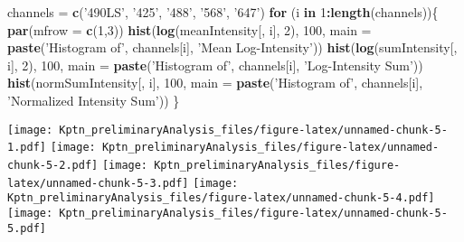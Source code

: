 \documentclass[]{article}
\newenvironment{Shaded}{\begin{snugshade}}{\end{snugshade}}
\newcommand{\ControlFlowTok}[1]{\textcolor[rgb]{0.13,0.29,0.53}{\textbf{#1}}}
\newcommand{\DataTypeTok}[1]{\textcolor[rgb]{0.13,0.29,0.53}{#1}}
\newcommand{\DecValTok}[1]{\textcolor[rgb]{0.00,0.00,0.81}{#1}}
\newcommand{\KeywordTok}[1]{\textcolor[rgb]{0.13,0.29,0.53}{\textbf{#1}}}
\newcommand{\NormalTok}[1]{#1}
\newcommand{\OperatorTok}[1]{\textcolor[rgb]{0.81,0.36,0.00}{\textbf{#1}}}
\newcommand{\StringTok}[1]{\textcolor[rgb]{0.31,0.60,0.02}{#1}}
\begin{document}
\begin{Shaded}
\begin{Highlighting}[]
\NormalTok{channels =}\StringTok{ }\KeywordTok{c}\NormalTok{(}\StringTok{'490LS'}\NormalTok{, }\StringTok{'425'}\NormalTok{, }\StringTok{'488'}\NormalTok{, }\StringTok{'568'}\NormalTok{, }\StringTok{'647'}\NormalTok{)}
\ControlFlowTok{for}\NormalTok{ (i }\ControlFlowTok{in} \DecValTok{1}\OperatorTok{:}\KeywordTok{length}\NormalTok{(channels))\{}
\KeywordTok{par}\NormalTok{(}\DataTypeTok{mfrow =} \KeywordTok{c}\NormalTok{(}\DecValTok{1}\NormalTok{,}\DecValTok{3}\NormalTok{))}
\KeywordTok{hist}\NormalTok{(}\KeywordTok{log}\NormalTok{(meanIntensity[, i], }\DecValTok{2}\NormalTok{), }\DecValTok{100}\NormalTok{, }\DataTypeTok{main =} \KeywordTok{paste}\NormalTok{(}\StringTok{'Histogram of'}\NormalTok{, channels[i], }\StringTok{'Mean Log-Intensity'}\NormalTok{))}
\KeywordTok{hist}\NormalTok{(}\KeywordTok{log}\NormalTok{(sumIntensity[, i], }\DecValTok{2}\NormalTok{), }\DecValTok{100}\NormalTok{, }\DataTypeTok{main =} \KeywordTok{paste}\NormalTok{(}\StringTok{'Histogram of'}\NormalTok{, channels[i], }\StringTok{'Log-Intensity Sum'}\NormalTok{))}
\KeywordTok{hist}\NormalTok{(normSumIntensity[, i], }\DecValTok{100}\NormalTok{, }\DataTypeTok{main =} \KeywordTok{paste}\NormalTok{(}\StringTok{'Histogram of'}\NormalTok{, channels[i], }\StringTok{'Normalized Intensity Sum'}\NormalTok{))}
\NormalTok{\}}
\end{Highlighting}
\end{Shaded}

\texttt{[image: Kptn\_preliminaryAnalysis\_files/figure-latex/unnamed-chunk-5-1.pdf]}
\texttt{[image: Kptn\_preliminaryAnalysis\_files/figure-latex/unnamed-chunk-5-2.pdf]}
\texttt{[image: Kptn\_preliminaryAnalysis\_files/figure-latex/unnamed-chunk-5-3.pdf]}
\texttt{[image: Kptn\_preliminaryAnalysis\_files/figure-latex/unnamed-chunk-5-4.pdf]}
\texttt{[image: Kptn\_preliminaryAnalysis\_files/figure-latex/unnamed-chunk-5-5.pdf]}
\end{document}
